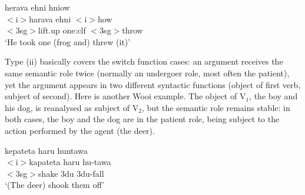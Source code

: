 \ea \label{wooi005}
\gll herava ehni hniow \\
$<$i$>$harava ehni $<$i$>$how \\
\glc $<$3\acs{sg}$>$lift.up one:\acs{clf} $<$3\acs{sg}$>$throw \\
\glft `He took one (frog and) threw (it)' \\ 
\z
\xe

Type (ii) basically covers the switch function cases: an argument receives the same semantic role twice (normally an undergoer role, most often the patient), yet the argument appears in two different syntactic functions (object of first verb, subject of second). Here is another Wooi example. The object of V$_1$, the boy and his dog, is reanalysed as subject of V$_2$, but the semantic role remains stable: in both cases, the boy and the dog are in the patient role, being subject to the action performed by the agent (the deer).

\ea \label{}
\gll kepateta haru huntawa \\
$<$i$>$kapateta haru hu-tawa \\
\glc $<$3\acs{sg}$>$shake 3\acs{du} 3\acs{du}-fall \\
\glft `(The deer) shook them off' \\ 
\z
\xe

